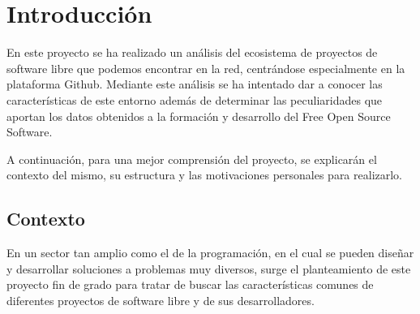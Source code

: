 \documentclass[a4paper, spanish, 12pt]{book}
\begin{document}

\tableofcontents
\cleardoublepage
\listoffigures %



\cleardoublepage
\chapter{Introducci\'on}
\label{sec:intro} %

En este proyecto se ha realizado un an\'alisis del ecosistema de proyectos de
software libre que podemos encontrar en la red, centr\'andose especialmente en
la plataforma Github. Mediante este an\'alisis se ha intentado dar a conocer las
caracter\'isticas de este entorno adem\'as de determinar las peculiaridades que
aportan los datos obtenidos a la formaci\'on y desarrollo del Free Open Source Software.

A continuaci\'on, para una mejor comprensi\'on del proyecto, se explicar\'an el
contexto del mismo, su estructura y las motivaciones personales para realizarlo.

\section{Contexto}
\label{sec:contexto}

En un sector tan amplio como el de la programaci\'on, en el cual se pueden dise\~nar
y desarrollar soluciones a problemas muy diversos, surge el planteamiento de este
proyecto fin de grado para tratar de buscar las caracter\'isticas comunes de
diferentes proyectos de software libre y de sus desarrolladores.
\end{document}
